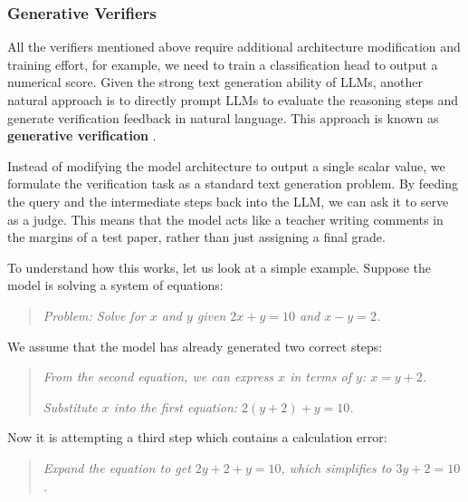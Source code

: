 \subsubsection{Generative Verifiers}

All the verifiers mentioned above require additional architecture modification and training effort, for example, we need to train a classification head to output a numerical score. Given the strong text generation ability of LLMs, another natural approach is to directly prompt LLMs to evaluate the reasoning steps and generate verification feedback in natural language. This approach is known as \textbf{generative verification} \cite{zheng-etal:2023judging}.

Instead of modifying the model architecture to output a single scalar value, we formulate the verification task as a standard text generation problem. By feeding the query and the intermediate steps back into the LLM, we can ask it to serve as a judge. This means that the model acts like a teacher writing comments in the margins of a test paper, rather than just assigning a final grade.

To understand how this works, let us look at a simple example. Suppose the model is solving a system of equations:
\vspace{0.5em}
\begin{quote}
\textit{Problem: Solve for $x$ and $y$ given $2x + y = 10$ and $x - y = 2$.}
\end{quote}
\vspace{0.5em}

We assume that the model has already generated two correct steps:
\vspace{0.5em}
\begin{quote}
\textit{From the second equation, we can express $x$ in terms of $y$: $x = y + 2$.}

\textit{Substitute $x$ into the first equation: $2(y + 2) + y = 10$.}
\end{quote}
\vspace{0.5em}

Now it is attempting a third step which contains a calculation error:

\vspace{0.5em}
\begin{quote}
\textit{Expand the equation to get $2y + 2 + y = 10$, which simplifies to $3y + 2 = 10$.}
\end{quote}
\vspace{0.5em}

